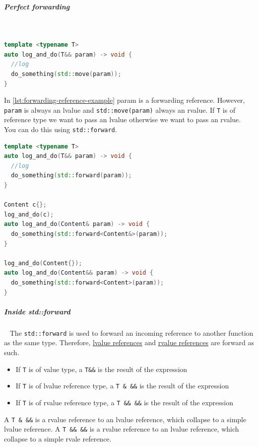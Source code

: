 \documentclass[11pt,twoside,landscape]{article}
\begin{document}
\begin{multicols}{2}
\subparagraph{Perfect forwarding} \
\label{sec:org97dab5c}
\begin{lstlisting}[language=c++,label=lst:forwarding-reference-example,caption={Forwarding Reference example},captionpos=b,numbers=none]
template <typename T>
auto log_and_do(T&& param) -> void {
  //log
  do_something(std::move(param));
}
\end{lstlisting}

In \autoref{lst:forwarding-reference-example} param is a forwarding reference.
However, \texttt{param} is always an lvalue and \texttt{std::move(param)} always an rvalue.
If \texttt{T} is of reference type we want to pass an lvalue otherwise we want to pass an rvalue.
You can do this using \texttt{std::forward}.

\begin{lstlisting}[language=c++,label=lst:forwarding-reference-using-std-forward-example,caption={Forwarding Reference using std::forward example},captionpos=b,numbers=none]
template <typename T>
auto log_and_do(T&& param) -> void {
  //log
  do_something(std::forward(param));
}

Content c{};
log_and_do(c);
auto log_and_do(Content& param) -> void {
  do_something(std::forward<Content&>(param));
}

log_and_do(Content{});
auto log_and_do(Content&& param) -> void {
  do_something(std::forward<Content>(param));
}
\end{lstlisting}
\subparagraph{Inside std::forward} \
\label{sec:orge75a7bc}
The \texttt{std::forward} is used to forward an incoming reference to another function as the same type.
Therefore, \href{../../../roam/20230622083312-what_are_lvalue_references.org}{lvalue references} and \href{../../../roam/20230622083721-what_are_rvalue_references.org}{rvalue references} are forward as such.

\begin{itemize}
\item If \texttt{T} is of value type, a \texttt{T\&\&} is the result of the expression
\item If \texttt{T} is of lvalue reference type, a \texttt{T \& \&\&} is the result of the expression
\item If \texttt{T} is of rvalue reference type, a \texttt{T \&\& \&\&} is the result of the expression
\end{itemize}


A \texttt{T \& \&\&} is a rvalue reference to an lvalue reference, which collapse to a simple lvalue reference.
A \texttt{T \&\& \&\&} is a rvalue reference to an lvalue reference, which collapse to a simple rvale reference.


\end{multicols}
\end{document}
